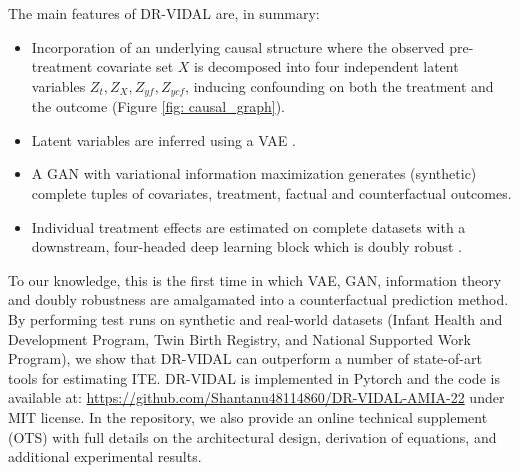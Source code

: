 \documentclass{amia}
\begin{document}
The main features of DR-VIDAL are, in summary:
\begin{itemize}[noitemsep]
  \item Incorporation of an underlying causal structure where the observed pre-treatment covariate set $X$ is decomposed into four independent latent variables $Z_t, Z_X, Z_{yf}, Z_{ycf}$, inducing confounding on both the treatment and the outcome (Figure \ref{fig: causal_graph}). 
  \item Latent variables are inferred using a VAE \cite{kingma2013auto}.
  \item A GAN \cite{goodfellow2014generative} with variational information maximization \cite{chen2016infogan} generates (synthetic) complete tuples of covariates, treatment, factual and counterfactual outcomes.
  \item Individual treatment effects are estimated on complete datasets with a downstream, four-headed deep learning block which is doubly robust \cite{funk2011doubly, dudik2014doubly}.
\end{itemize}
To our knowledge, this is the first time in which VAE, GAN, information theory and doubly robustness are amalgamated into a counterfactual prediction method. By performing test runs on synthetic and real-world datasets (Infant Health and Development Program, Twin Birth Registry, and National Supported Work Program), we show that DR-VIDAL can outperform a number of state-of-art tools for estimating ITE. DR-VIDAL is implemented in Pytorch and the code is available at: \url{https://github.com/Shantanu48114860/DR-VIDAL-AMIA-22} under MIT license. In the repository, we also provide an online technical supplement (OTS) with full details on the architectural design, derivation of equations, and additional experimental results.




\end{document}
